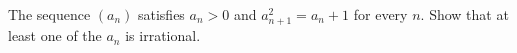 The sequence $(a_n)$ satisfies $a_n > 0$ and $a_{n+1}^2 = a_n + 1$ for every $n$. Show that at least one of the $a_n$ is irrational.
